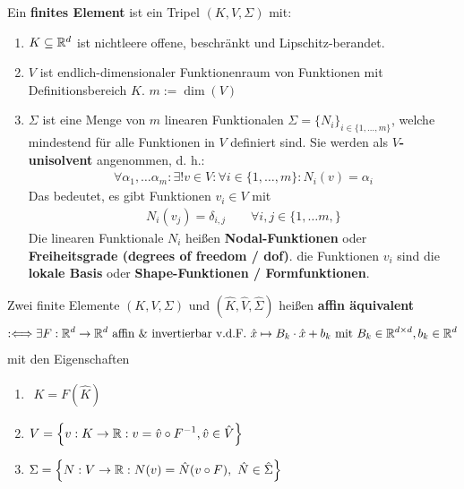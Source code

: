 \begin{definition}\enter %
Ein \textbf{finites Element} ist ein Tripel $(K,V,\Sigma)$ mit:
\begin{enumerate}[label=(\roman*)]
\item $K\subseteq\mathbb{R}^d$ ist nichtleere offene, beschränkt und Lipschitz-berandet.
\item $V$ ist endlich-dimensionaler Funktionenraum von Funktionen mit Definitionsbereich $K$. $m:=\dim(V)$
\item $\Sigma$ ist eine Menge von $m$ linearen Funktionalen $\Sigma=\lbrace N_i\rbrace_{i\in\lbrace1,\ldots,m\rbrace}$, welche mindestend für alle Funktionen in $V$ definiert sind. Sie werden als \textbf{$V$-unisolvent} angenommen, d. h.:
\begin{align*}
\forall \alpha_1,\ldots\alpha_m:\exists! v\in V:\forall i\in\lbrace1,\ldots,m\rbrace:N_i(v)=\alpha_i
\end{align*}
Das bedeutet, es gibt Funktionen $v_i\in V$ mit
\begin{align*}
N_i(v_j)=\delta_{i,j}\qquad\forall i,j\in\lbrace1,\ldots m,\rbrace
\end{align*}
Die linearen Funktionale $N_i$ heißen \textbf{Nodal-Funktionen} oder \textbf{Freiheitsgrade (degrees of freedom / dof)}. die Funktionen $v_i$ sind die \textbf{lokale Basis} oder \textbf{Shape-Funktionen / Formfunktionen}.
\end{enumerate}
\end{definition}

\begin{definition}\enter %
Zwei finite Elemente $(K,V,\Sigma)$ und $(\hat{K},\hat{V},\hat{\Sigma})$ heißen \textbf{affin äquivalent}
\begin{align*}
:\Longleftrightarrow\exists F:\mathbb{R}^d\to\mathbb{R}^d\text{ affin \& invertierbar v.d.F. }
\hat{x}\mapsto B_k\cdot\hat{x}+b_k\text{ mit } B_k\in\mathbb{R}^{d\times d},b_k\in\mathbb{R}^d
\end{align*}
mit den Eigenschaften
\begin{enumerate}[label=(\arabic*)]
\item $\begin{aligned}
K=F(\hat{K})
\end{aligned}$
\item $\begin{aligned}
V=\Big\lbrace v: K\to\mathbb{R}:v=\hat{v}\circ F^{-1},\hat{v}\in\hat{V}\Big\rbrace
\end{aligned}$
\item $\begin{aligned}
\Sigma=\Big\lbrace N:V\to\mathbb{R}:N(v)=\hat{N}(v\circ F),~\hat{N}\in\hat{\Sigma}\Big\rbrace
\end{aligned}$
\end{enumerate}

\end{definition}

